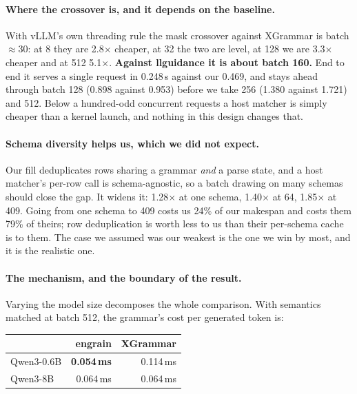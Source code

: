 \documentclass{article}
\begin{document}
\paragraph{Where the crossover is, and it depends on the baseline.} With
vLLM's own threading rule the mask crossover against XGrammar is batch
$\approx$30: at 8 they are 2.8$\times$ cheaper, at 32 the two are level, at 128
we are 3.3$\times$ cheaper and at 512 5.1$\times$. \textbf{Against llguidance
it is about batch 160.} End to end it serves a single request in 0.248\,s
against our 0.469, and stays ahead through batch 128 (0.898 against 0.953)
before we take 256 (1.380 against 1.721) and 512. Below a hundred-odd
concurrent requests a host matcher is simply cheaper than a kernel launch, and
nothing in this design changes that.

\paragraph{Schema diversity helps us, which we did not expect.} Our fill
deduplicates rows sharing a grammar \emph{and} a parse state, and a host
matcher's per-row call is schema-agnostic, so a batch drawing on many schemas
should close the gap. It widens it: 1.28$\times$ at one schema, 1.40$\times$ at
64, 1.85$\times$ at 409. Going from one schema to 409 costs us 24\% of our
makespan and costs them 79\% of theirs; row deduplication is worth less to us
than their per-schema cache is to them. The case we assumed was our weakest is
the one we win by most, and it is the realistic one.

\paragraph{The mechanism, and the boundary of the result.} Varying the model
size decomposes the whole comparison. With semantics matched at batch 512, the
grammar's cost per generated token is:

\begin{center}
\begin{small}
\begin{tabular}{lrr}
\toprule
 & engrain & XGrammar \\
\midrule
Qwen3-0.6B & \textbf{0.054\,ms} & 0.114\,ms \\
Qwen3-8B & 0.064\,ms & 0.064\,ms \\
\bottomrule
\end{tabular}
\end{small}
\end{center}
\end{document}
